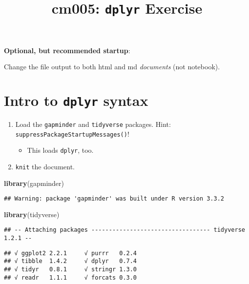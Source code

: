 \documentclass[]{article}
\title{cm005: \texttt{dplyr} Exercise}
\author{}
\date{}
\newenvironment{Shaded}{\begin{snugshade}}{\end{snugshade}}
\newcommand{\KeywordTok}[1]{\textcolor[rgb]{0.13,0.29,0.53}{\textbf{{#1}}}}
\newcommand{\NormalTok}[1]{{#1}}
\providecommand{\tightlist}{%
  \setlength{\itemsep}{0pt}\setlength{\parskip}{0pt}}
\begin{document}
\maketitle

\textbf{Optional, but recommended startup}:

Change the file output to both html and md \emph{documents} (not
notebook).

\section{\texorpdfstring{Intro to \texttt{dplyr}
syntax}{Intro to dplyr syntax}}\label{intro-to-dplyr-syntax}

\begin{enumerate}
\def\labelenumi{\arabic{enumi}.}
\tightlist
\item
  Load the \texttt{gapminder} and \texttt{tidyverse} packages. Hint:
  \texttt{suppressPackageStartupMessages()}!

  \begin{itemize}
  \tightlist
  \item
    This loads \texttt{dplyr}, too.
  \end{itemize}
\item
  \texttt{knit} the document.
\end{enumerate}

\begin{Shaded}
\begin{Highlighting}[]
\KeywordTok{library}\NormalTok{(gapminder)}
\end{Highlighting}
\end{Shaded}

\begin{verbatim}
## Warning: package 'gapminder' was built under R version 3.3.2
\end{verbatim}

\begin{Shaded}
\begin{Highlighting}[]
\KeywordTok{library}\NormalTok{(tidyverse)}
\end{Highlighting}
\end{Shaded}

\begin{verbatim}
## -- Attaching packages ---------------------------------- tidyverse 1.2.1 --
\end{verbatim}

\begin{verbatim}
## √ ggplot2 2.2.1     √ purrr   0.2.4
## √ tibble  1.4.2     √ dplyr   0.7.4
## √ tidyr   0.8.1     √ stringr 1.3.0
## √ readr   1.1.1     √ forcats 0.3.0
\end{verbatim}
\end{document}
